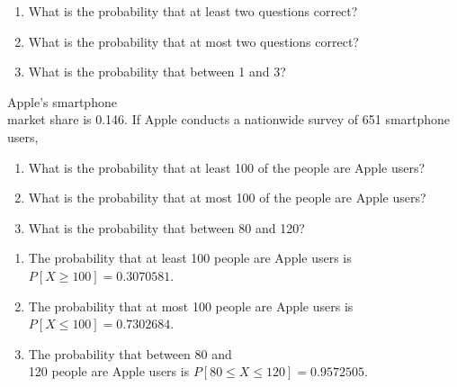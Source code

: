 \documentclass[11pt, chapterprefix=true]{scrbook}\usepackage[]{graphicx}\usepackage[]{color}
\begin{document}
\begin{exercises}
\begin{exercise}
\begin{enumerate}
\item What is the probability that at least two questions correct?
\item What is the probability that at most two questions correct?
\item What is the probability that between 1 and 3?
\end{enumerate}
	\end{exercise}
%
%

  \begin{exercise} %

Apple's smartphone \\ market  share is  0.146. If Apple conducts a nationwide survey of 651 smartphone \\ users,

\begin{enumerate}
\item What is the probability that at least 100 of the people are Apple users?
\item What is the probability that at most 100 of the people are Apple users?
\item What is the probability that between 80 and 120?
\end{enumerate}

	\end{exercise}
	\begin{solution}  %


\begin{enumerate}
\item The probability that at least 100 people are Apple users is $P[X \ge 100] = 0.3070581$.
\item The probability that at most 100 people are Apple users is $P[X \le 100] = 0.7302684$.
\item The probability that between 80 and \\ 120 people are Apple users is $P[ 80 \le X \le 120] = 0.9572505$.
\end{enumerate}
	\end{solution}


\end{exercises}
\end{document}
